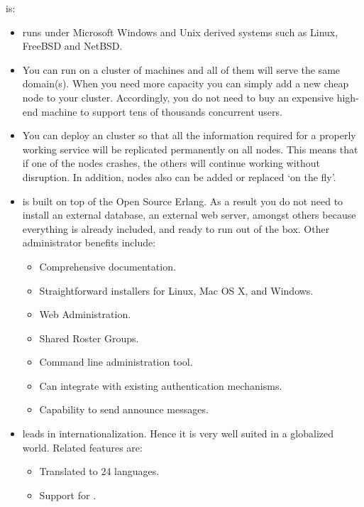 \ejabberd{} is:
\begin{itemize}
\item {} \ejabberd{} runs under Microsoft Windows and Unix derived systems such as Linux, FreeBSD and NetBSD.

\item {} You can run \ejabberd{} on a cluster of machines and all of them will serve the same \Jabber{} domain(s). When you need more capacity you can simply add a new cheap node to your cluster. Accordingly, you do not need to buy an expensive high-end machine to support tens of thousands concurrent users.

\item {} You can deploy an \ejabberd{} cluster so that all the information required for a properly working service will be replicated permanently on all nodes. This means that if one of the nodes crashes, the others will continue working without disruption. In addition, nodes also can be added or replaced `on the fly'.

\item {} \ejabberd{} is built on top of the Open Source Erlang. As a result you do not need to install an external database, an external web server, amongst others because everything is already included, and ready to run out of the box. Other administrator benefits include:
\begin{itemize}
\item Comprehensive documentation.
\item Straightforward installers for Linux, Mac OS X, and Windows. %
\item Web Administration.
\item Shared Roster Groups.
\item Command line administration tool. %
\item Can integrate with existing authentication mechanisms.
\item Capability to send announce messages.
\end{itemize}

\item {} \ejabberd{} leads in internationalization. Hence it is very well suited in a globalized world. Related features are:
\begin{itemize}
\item Translated to 24 languages. %
\item Support for .
\end{itemize}


\end{itemize}

